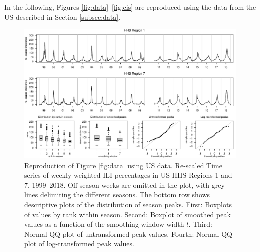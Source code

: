 \documentclass[12pt]{article}
\begin{document}
In the following, Figures \ref{fig:data}--\ref{fig:cis} are reproduced using the data from the US described in Section \ref{subsec:data}.

\begin{figure}[h]
\center
\includegraphics[width=1\textwidth]{figure/plot_data_us.pdf}
\caption{Reproduction of Figure \ref{fig:data} using US data. Re-scaled Time series of weekly weighted ILI percentages in US HHS Regions 1 and 7, 1999--2018. Off-season weeks are omitted in the plot, with grey lines delimiting the different seasons. The bottom row shows descriptive plots of the distribution of season peaks. First: Boxplots of values by rank within season. Second: Boxplot of smoothed peak values as a function of the smoothing window width $l$. Third: Normal QQ plot of untransformed peak values. Fourth: Normal QQ plot of log-transformed peak values.}
\label{fig:data_us}
\end{figure}

\newpage
\end{document}
